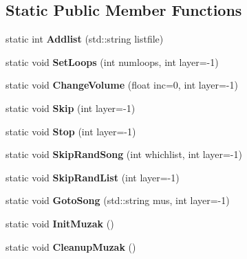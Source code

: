 \subsection*{Static Public Member Functions}
\begin{DoxyCompactItemize}
\item 
static int {\bfseries Addlist} (std\+::string listfile)\hypertarget{classMusic_aa1d96ad3d1b14e378dd98d87c7169b28}{}\label{classMusic_aa1d96ad3d1b14e378dd98d87c7169b28}

\item 
static void {\bfseries Set\+Loops} (int numloops, int layer=-\/1)\hypertarget{classMusic_a8526a94be7abb82f78cb88ac6f591666}{}\label{classMusic_a8526a94be7abb82f78cb88ac6f591666}

\item 
static void {\bfseries Change\+Volume} (float inc=0, int layer=-\/1)\hypertarget{classMusic_aefc00b5265f32b0941275389e1bf97b7}{}\label{classMusic_aefc00b5265f32b0941275389e1bf97b7}

\item 
static void {\bfseries Skip} (int layer=-\/1)\hypertarget{classMusic_a1aa971f3e8928ed2090651caca7cc57c}{}\label{classMusic_a1aa971f3e8928ed2090651caca7cc57c}

\item 
static void {\bfseries Stop} (int layer=-\/1)\hypertarget{classMusic_a44e36fec0808aa992f32b4b491266436}{}\label{classMusic_a44e36fec0808aa992f32b4b491266436}

\item 
static void {\bfseries Skip\+Rand\+Song} (int whichlist, int layer=-\/1)\hypertarget{classMusic_addb7903418a7b0073a45dc3a4b0f3942}{}\label{classMusic_addb7903418a7b0073a45dc3a4b0f3942}

\item 
static void {\bfseries Skip\+Rand\+List} (int layer=-\/1)\hypertarget{classMusic_ab6c9be4273aa0deadfe6c391405b1ed5}{}\label{classMusic_ab6c9be4273aa0deadfe6c391405b1ed5}

\item 
static void {\bfseries Goto\+Song} (std\+::string mus, int layer=-\/1)\hypertarget{classMusic_a94b6f0af371878da16ab82a5df21bb75}{}\label{classMusic_a94b6f0af371878da16ab82a5df21bb75}

\item 
static void {\bfseries Init\+Muzak} ()\hypertarget{classMusic_abd86ef3742a5c80d7b030043f4e39f6c}{}\label{classMusic_abd86ef3742a5c80d7b030043f4e39f6c}

\item 
static void {\bfseries Cleanup\+Muzak} ()\hypertarget{classMusic_a0dfd5104a5e49922a003c54c60a1e7ae}{}\label{classMusic_a0dfd5104a5e49922a003c54c60a1e7ae}


\end{DoxyCompactItemize}
